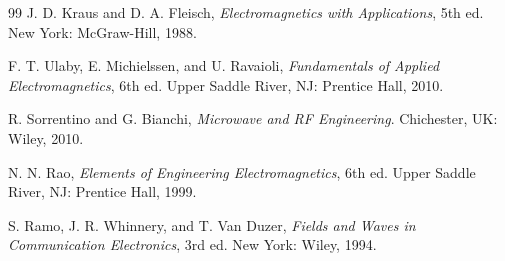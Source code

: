 \documentclass[11pt,a4paper]{article}
\begin{document}
\begin{thebibliography}{99}
J. D. Kraus and D. A. Fleisch, \emph{Electromagnetics with Applications}, 5th ed. New York: McGraw-Hill, 1988.

F. T. Ulaby, E. Michielssen, and U. Ravaioli, \emph{Fundamentals of Applied Electromagnetics}, 6th ed. Upper Saddle River, NJ: Prentice Hall, 2010.

R. Sorrentino and G. Bianchi, \emph{Microwave and RF Engineering}. Chichester, UK: Wiley, 2010.

N. N. Rao, \emph{Elements of Engineering Electromagnetics}, 6th ed. Upper Saddle River, NJ: Prentice Hall, 1999.

S. Ramo, J. R. Whinnery, and T. Van Duzer, \emph{Fields and Waves in Communication Electronics}, 3rd ed. New York: Wiley, 1994.

\end{thebibliography}
\end{document}
